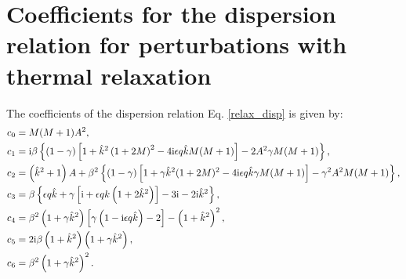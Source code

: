 \section{Coefficients for the dispersion relation for perturbations
with thermal relaxation}\label{relax_coeff}
The coefficients of the dispersion relation Eq. \ref{relax_disp} is
given by:
\begin{align}
  &c_0 = M(M+1)A^2,\\
  &c_1 = \mathrm{i}\beta\left\{\left(1-\gamma\right)\left[1 +
      \hat{k}^2\left(1+2M\right)^2 - 4 \mathrm{i}\epsilon q\hat{k} M (M+1)\right] 
    - 2A^2\gamma M (M+1)\right\},\\
  &c_2 = \left(\hat{k}^2 + 1\right)A + \beta^2\left\{(1-\gamma)\left[1
      + \gamma \hat{k}^2(1+2M)^2 - 4\mathrm{i}\epsilon q \hat{k} \gamma M(M+1)
    \right]
    -\gamma^2 A^2 M(M+1)
  \right\},\\
  &c_3 = \beta\left\{\epsilon q \hat{k} + \gamma \left[\mathrm{i} + \epsilon q
      k \left(1+2\hat{k}^2\right)\right] - 3\mathrm{i} - 2\mathrm{i}
    \hat{k}^2\right\},\\
  &c_4 =
  \beta^2\left(1+\gamma\hat{k}^2\right)\left[\gamma\left(1-\mathrm{i}\epsilon q
    \hat{k}\right)-2\right] - \left(1+\hat{k}^2\right)^2,\\
&c_5 = 2\mathrm{i}\beta\left(1+\hat{k}^2\right)\left(1+\gamma\hat{k}^2\right),\\
&c_6 = \beta^2\left(1+\gamma\hat{k}^2\right)^2.
\end{align}

